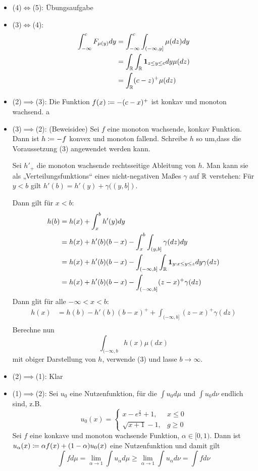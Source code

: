 \documentclass[a4paper,twoside,DIV15,BCOR12mm]{scrbook}
\begin{document}
\begin{beweis}
\begin{itemize}
\item (4)$\iff$(5): Übungsaufgabe
\item (3)$\iff$(4):
\begin{align*}
\int_{-\infty}^c F_{\mu(y)}dy &= \int_{-\infty}^c \int_{(-\infty,y]} \mu(dz)dy \\
&=\int_{\mathbb{R}} \int_{\mathbb{R}} \mathbf 1_{z\le y\le c}dy \mu(dz) \\
&=\int_{\mathbb{R}} (c-z)^+ \mu(dz)
\end{align*}
\item (2)$\implies$(3): Die Funktion $f(x) \da -(c-x)^+$ ist konkav und monoton wachsend.
a\item (3)$\implies$(2): (Beweisidee) Sei $f$ eine monoton wachsende, konkav Funktion. Dann ist $h\da -f$ konvex und monoton fallend. Schreibe $h$ so um,dass die Voraussetzung (3) angewendet werden kann.

Sei $h'_+$ die monoton wachsende rechtsseitige Ableitung von $h$. Man kann sie als „Verteilungsfunktions“ eines nicht-negativen Maßes $\gamma$ auf $\mathbb{R}$ verstehen: Für $y<b$ gilt $h'(b) = h'(y) + \gamma( (y,b])$.

Dann gilt für $x<b$:
\begin{align*}
h(b) &= h(x) + \int_x^b h'(y) dy \\
&=h(x) + h'(b)(b-x) -\int_x^b \int_{(y,b]} \gamma(dz)dy \\
&=h(x) + h'(b)(b-x) - \int_{(-\infty,b]}\int_{\mathbb{R}} \mathbf 1_{y:x\le y \le z} dy \gamma(dz) \\
&=h(x) + h'(b)(b-x) - \int_{(-\infty,b]} (z-x)^+ \gamma(dz) 
\end{align*}
Dann glit für alle $-\infty<x<b$:
\begin{align*}
h(x) &= h(b) - h'(b)(b-x)^+ + \int_{(-\infty,b]} (z-x)^+ \gamma(dz) \\
\end{align*}
Berechne nun
\[
\int_{(-\infty,b} h(x) \mu(dx)
\]
 mit obiger Darstellung von $h$, verwende (3) und lasse $b\to\infty$.
\item (2)$\implies$(1): Klar
\item (1)$\implies$(2): Sei $u_0$ eine Nutzenfunktion, für die $\int u_0d\mu$ und $\int u_0d\nu$ endlich sind, z.B.
\[
u_0(x) = 
\begin{cases}
x - e^{\frac x2} + 1, & x\le 0\\
\sqrt{x + 1} -1, &g\ge 0
\end{cases}
\]
Sei $f$ eine konkave und monoton wachsende Funktion, $\alpha \in [0,1)$. Dann ist $u_\alpha(x) \da \alpha f(x) + (1-\alpha)u_0(x)$ eine Nutzenfunktion und damit gilt 
\[
\int f d\mu = \lim_{\alpha\to 1} \int u_\alpha d\mu \ge \lim_{\alpha \to 1} \int u_{\alpha}d\nu = \int f d\nu
\]
\end{itemize}
\end{beweis}
\end{document}
